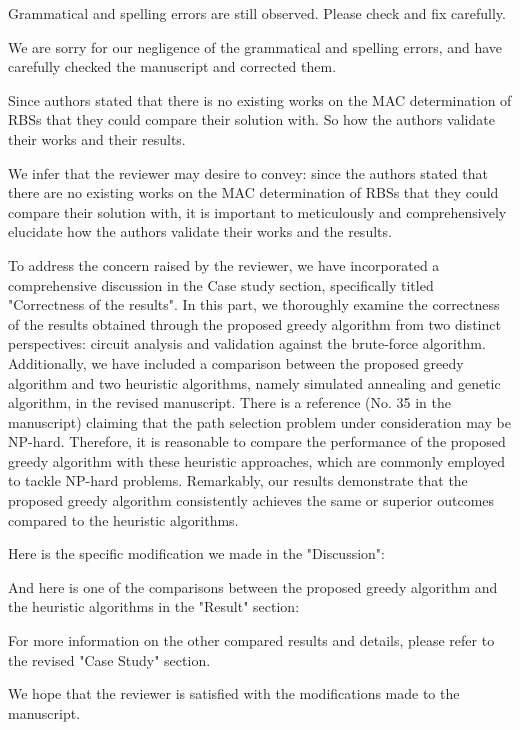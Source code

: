 \reviewer
\begin{revcomment}
  Grammatical and spelling errors are still observed. Please check and fix carefully.
\end{revcomment}
\begin{revresponse}

We are sorry for our negligence of the grammatical and spelling errors, and have carefully checked the manuscript and corrected them. 

\end{revresponse}

\begin{revcomment}
  Since authors stated that there is no existing works on the MAC determination of RBSs that they could compare their solution with. So how the authors validate their works and their results.
\end{revcomment}
\begin{revresponse}

We infer that the reviewer may desire to convey: since the authors stated that there are no existing works on the MAC determination of RBSs that they could compare their solution with, it is important to meticulously and comprehensively elucidate how the authors validate their works and the results.


To address the concern raised by the reviewer, we have incorporated a comprehensive discussion in the Case study section, specifically titled "Correctness of the results". 
In this part, we thoroughly examine the correctness of the results obtained through the proposed greedy algorithm from two distinct perspectives: circuit analysis and validation against the brute-force algorithm. 
Additionally, we have included a comparison between the proposed greedy algorithm and two heuristic algorithms, namely simulated annealing and genetic algorithm, in the revised manuscript. 
There is a reference (No. 35 in the manuscript) claiming that the path selection problem under consideration may be NP-hard.
Therefore, it is reasonable to compare the performance of the proposed greedy algorithm with these heuristic approaches, which are commonly employed to tackle NP-hard problems.
Remarkably, our results demonstrate that the proposed greedy algorithm consistently achieves the same or superior outcomes compared to the heuristic algorithms.


Here is the specific modification we made in the "Discussion":
\begin{changes}
\end{changes}
And here is one of the comparisons between the proposed greedy algorithm and the heuristic algorithms in the "Result" section:
\begin{changes}
\end{changes}
For more information on the other compared results and details, please refer to the revised "Case Study" section.


We hope that the reviewer is satisfied with the modifications made to the manuscript.
\end{revresponse}

